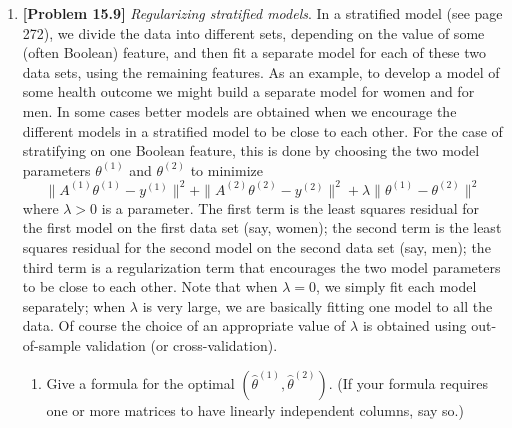 \begin{enumerate}[label=(\alph*)]
	      \newpage
	\item \textbf{[Problem 15.9]} \textit{Regularizing stratified models}. In a
	      stratified model (see page 272), we divide the data into different sets,
	      depending on the value of some (often Boolean) feature, and then fit a
	      separate model for each of these two data sets, using the remaining
	      features. As an example, to develop a model of some health outcome we
	      might build a separate model for women and for men. In some cases better
	      models are obtained when we encourage the different models in a
	      stratified model to be close to each other. For the case of stratifying
	      on one Boolean feature, this is done by choosing the two model
	      parameters $\theta^{(1)}$ and $\theta^{(2)}$ to minimize
	      $$ \parallel A^{(1)} \theta^{(1)} - y^{(1)} \parallel^2 + \parallel
		      A^{(2)} \theta^{(2)} - y^{(2)} \parallel^2 + \lambda \parallel
		      \theta^{(1)} - \theta^{(2)} \parallel^2 $$
	      where $\lambda > 0$ is a parameter. The first term is the least
	      squares residual for the first model on the first data set (say,
	      women); the second term is the least squares residual for the second
	      model on the second data set (say, men); the third term is a
	      regularization term that encourages the two model parameters to be
	      close to each other. Note that when $\lambda = 0$, we simply fit each
	      model separately; when $\lambda$ is very large, we are basically
	      fitting one model to all the data. Of course the choice of an
	      appropriate value of $\lambda$ is obtained using out-of-sample
	      validation (or cross-validation).
	      \begin{enumerate}[label=(\alph*)]
		      \item  Give a formula for the optimal $(\hat{\theta}^{(1)} ,
			            \hat{\theta}^{(2)} )$. (If your formula requires one or
		            more matrices to have linearly independent columns, say
		            so.)


\end{enumerate}
\end{enumerate}
